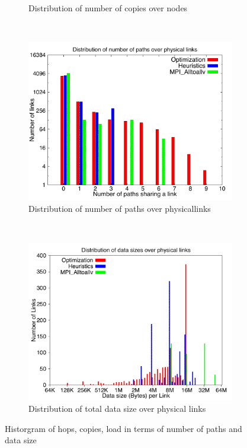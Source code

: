 \documentclass[letter]{article}
\begin{document}
\begin{figure}[h]
\begin{subfigure}[b]{0.49\textwidth}
                \caption{Distribution of number of copies over nodes}
                \label{fig:512_copy}
        \end{subfigure}
        ~ %
        \begin{subfigure}[b]{0.49\textwidth}
                \includegraphics[width=\textwidth]{report_figures/loadpath_histo.pdf}
                \caption{Distribution of number of paths over physicallinks}
                \label{fig:512_loadpath}
        \end{subfigure}
	~ %
	\begin{subfigure}[b]{0.49\textwidth}
                \includegraphics[width=\textwidth]{report_figures/loaddata_histo.pdf}
                \caption{Distribution of total data size over physical links}
                \label{fig:512_loaddata}
        \end{subfigure}
        \caption{Historgram of hops, copies, load in terms of number of paths and data size}\label{fig:animals}
	\label{fig:512_histo}
\end{figure}
\end{document}
